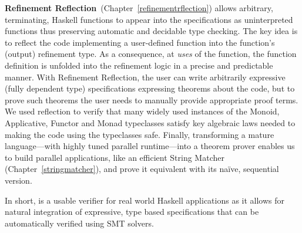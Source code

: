 \textbf{Refinement Reflection}~(Chapter~\ref{refinementrflection})
allows arbitrary, terminating, Haskell functions to 
appear into the specifications 
as uninterpreted functions thus preserving automatic and decidable 
type checking. 
%
The key idea is to reflect the ​code implementing a​
user-defined function into the function's (output)
refinement type.
%
As a consequence, at \emph{uses} of the function,
the function definition is unfolded into the refinement logic
in a precise and predictable manner.
%
With Refinement Reflection, 
the user can write arbitrarily expressive (fully dependent type)
specifications expressing theorems about the code, 
but to prove such theorems the user needs to manually provide 
appropriate proof terms. 
%
We used reflection to verify
that many widely used instances of the Monoid,
Applicative, Functor and Monad typeclasses 
satisfy key algebraic laws needed to
making the code using the typeclasses safe.
%
Finally, transforming a mature language---with
highly tuned parallel runtime---into a theorem
prover  enables us to build parallel applications, 
like an efficient String Matcher (Chapter~\ref{stringmatcher}), 
and prove it equivalent with its na\"ive, sequential version.

In short, \toolname is a usable verifier for real world Haskell applications 
as it allows for natural integration of expressive, type based specifications 
that can be automatically verified using SMT solvers. 

